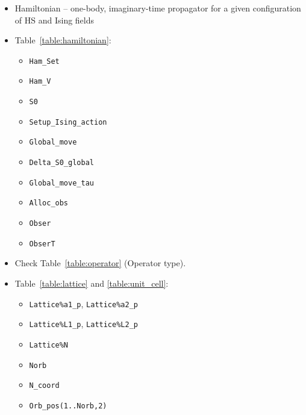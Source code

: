 \begin{itemize}
	\item Hamiltonian -- one-body, imaginary-time propagator for a given configuration of HS and  Ising fields
	\item Table~\ref{table:hamiltonian}:
	\begin{itemize}
		\item \texttt{Ham\_Set}
		\item \texttt{Ham\_V}
		\item \texttt{S0}
		\item \texttt{Setup\_Ising\_action}
		\item \texttt{Global\_move}
		\item \texttt{Delta\_S0\_global}
		\item \texttt{Global\_move\_tau}
		\item \texttt{Alloc\_obs}
		\item \texttt{Obser}
		\item \texttt{ObserT}
	\end{itemize}
	\item Check Table~\ref{table:operator} (Operator type).
	\item Table~\ref{table:lattice} and \ref{table:unit_cell}:
	\begin{itemize}
		\item \texttt{Lattice\%a1\_p}, \texttt{Lattice\%a2\_p}
		\item \texttt{Lattice\%L1\_p}, \texttt{Lattice\%L2\_p}
		\item \texttt{Lattice\%N}
		\item \texttt{Norb}
		\item \texttt{N\_coord}
		\item \texttt{Orb\_pos(1..Norb,2)}
	\end{itemize}
\end{itemize}

